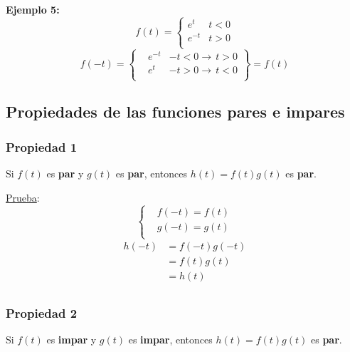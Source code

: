 \textbf{Ejemplo 5:}
\begin{equation*}
    f(t)=\begin{cases}
        e^t&t<0\\
        e^{-t}&t>0\\
    \end{cases}
\end{equation*}
\begin{equation*}
    f(-t)=\left\{\!\begin{aligned}
    &e^{-t}&-t<0\rightarrow\,t>0\\
    &e^{t}&-t>0\rightarrow\,t<0\\
    \end{aligned}\right\}
    =f(t)
\end{equation*}
\begin{figure}[H]
    \centering
    
\end{figure}

\subsection{Propiedades de las funciones pares e impares}
\subsubsection*{Propiedad 1}
Si $f(t)$ es \textbf{par} y $g(t)$ es \textbf{par}, entonces $h(t)=f(t)g(t)$ es
\textbf{par}.

\underline{Prueba}:
\begin{equation*}
\begin{cases}
    &f(-t)=f(t)\\
    &g(-t)=g(t)\\
\end{cases}
\end{equation*}
\begin{equation*}
\begin{split}
    h(-t)
        &=f(-t)g(-t)\\
        &=f(t)g(t)\\
        &=h(t)\\
\end{split}
\end{equation*}

\subsubsection*{Propiedad 2}
Si $f(t)$ es \textbf{impar} y $g(t)$ es \textbf{impar}, entonces $h(t)=f(t)g(t)$
es \textbf{par}.

